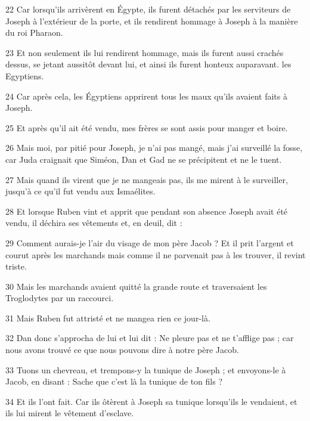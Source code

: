 \par 22 Car lorsqu'ils arrivèrent en Égypte, ils furent détachés par les serviteurs de Joseph à l'extérieur de la porte, et ils rendirent hommage à Joseph à la manière du roi Pharaon.

\par 23 Et non seulement ils lui rendirent hommage, mais ils furent aussi crachés dessus, se jetant aussitôt devant lui, et ainsi ils furent honteux auparavant. les Egyptiens.

\par 24 Car après cela, les Égyptiens apprirent tous les maux qu'ils avaient faits à Joseph.

\par 25 Et après qu'il ait été vendu, mes frères se sont assis pour manger et boire.

\par 26 Mais moi, par pitié pour Joseph, je n'ai pas mangé, mais j'ai surveillé la fosse, car Juda craignait que Siméon, Dan et Gad ne se précipitent et ne le tuent.

\par 27 Mais quand ils virent que je ne mangeais pas, ils me mirent à le surveiller, jusqu'à ce qu'il fut vendu aux Ismaélites.

\par 28 Et lorsque Ruben vint et apprit que pendant son absence Joseph avait été vendu, il déchira ses vêtements et, en deuil, dit :

\par 29 Comment aurais-je l'air du visage de mon père Jacob ? Et il prit l'argent et courut après les marchands mais comme il ne parvenait pas à les trouver, il revint triste.

\par 30 Mais les marchands avaient quitté la grande route et traversaient les Troglodytes par un raccourci.

\par 31 Mais Ruben fut attristé et ne mangea rien ce jour-là.

\par 32 Dan donc s'approcha de lui et lui dit : Ne pleure pas et ne t'afflige pas ; car nous avons trouvé ce que nous pouvons dire à notre père Jacob.

\par 33 Tuons un chevreau, et trempons-y la tunique de Joseph ; et envoyons-le à Jacob, en disant : Sache que c'est là la tunique de ton fils ?

\par 34 Et ils l'ont fait. Car ils ôtèrent à Joseph sa tunique lorsqu'ils le vendaient, et ils lui mirent le vêtement d'esclave.

